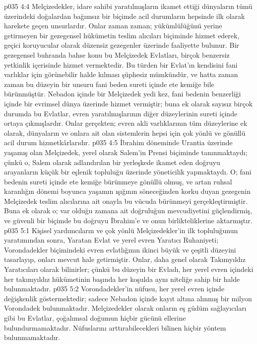 \vs p035 4:4 Melçizedekler, idare sahibi yaratılmışların ikamet ettiği dünyaların tümü üzerindeki doğalardan bağımsız bir biçimde acil durumların hepsinde ilk olarak harekete geçen unsurlardır. Onlar zaman zaman; yükümlülüğünü yerine getirmeyen bir gezegensel hükümetin teslim alıcıları biçiminde hizmet ederek, geçici koruyucular olarak düzensiz gezegenler üzerinde faaliyette bulunur. Bir gezegensel buhranda bahse konu bu Melçizedek Evlatları, birçok benzersiz yetkinlik içerisinde hizmet vermektedir. Bu türden bir Evlat’ın kendisini fani varlıklar için görünebilir halde kılması şüphesiz mümkündür, ve hatta zaman zaman bu düzeyin bir unsuru fani beden sureti içinde ete kemiğe bile bürünmüştür. Nebadon içinde bir Melçizedek yedi kez, fani bedenin benzerliği içinde bir evrimsel dünya üzerinde hizmet vermiştir; buna ek olarak sayısız birçok durumda bu Evlatlar, evren yaratılmışlarının diğer düzeylerinin sureti içinde ortaya çıkmışlardır. Onlar gerçekten; evren akli varlıklarının tüm düzeylerine ek olarak, dünyaların ve onlara ait olan sistemlerin hepsi için çok yönlü ve gönüllü acil durum hizmetkârlarıdır.
\vs p035 4:5 İbrahim döneminde Urantia üzerinde yaşamış olan Melçizedek, yerel olarak Salem’in Prensi biçiminde tanınmaktaydı; çünkü o, Salem olarak adlandırılan bir yerleşkede ikamet eden doğruyu arayanların küçük bir eşlenik topluluğu üzerinde yöneticilik yapmaktaydı. O; fani bedenin sureti içinde ete kemiğe bürünmeye gönüllü olmuş, ve artan ruhsal karanlığın dönemi boyunca yaşamın ışığının söneceğinden korku duyan gezegenin Melçizedek teslim alıcılarına ait onayla bu vücuda bürünmeyi gerçekleştirmiştir. Buna ek olarak o; var olduğu zamana ait doğruluğun mevcudiyetini güçlendirmiş, ve güvenli bir biçimde bu doğruyu İbrahim’e ve onun birlikteliklerine aktarmıştır.
\vs p035 5:1 Kişisel yardımcıların ve çok yönlü Melçizedekler’in ilk topluluğunun yaratımından sonra, Yaratan Evlat ve yerel evren Yaratıcı Ruhaniyeti; Vorondadekler biçimindeki evren evlatlığının ikinci büyük ve çeşitli düzeyini tasarlayıp, onları mevcut hale getirmiştir. Onlar, daha genel olarak Takımyıldız Yaratıcıları olarak bilinirler; çünkü bu düzeyin bir Evladı, her yerel evren içindeki her takımyıldız hükümetinin başında her koşulda aynı niteliğe sahip bir halde bulunmaktadır.
\vs p035 5:2 Vorondadekler’in nüfusu, her yerel evren içinde değişkenlik göstermektedir; sadece Nebadon içinde kayıt altına alınmış bir milyon Vorondadek bulunmaktadır. Melçizedekler olarak onların eş güdüm sağlayıcıları gibi bu Evlatlar, çoğalımsal doğumun hiçbir gücünü ellerine bulundurmamaktadır. Nüfuslarını arttırabilecekleri bilinen hiçbir yöntem bulunmamaktadır.
